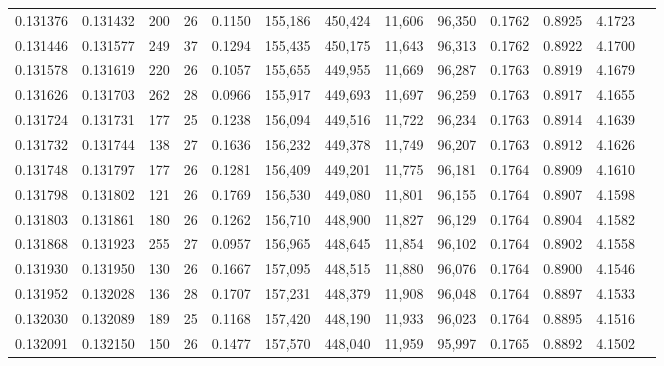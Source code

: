 \begin{tabular}{rrrrrrrrrrrrr}
0.131376 & 0.131432 &   200 &  26 &                                     0.1150 & 155,186 & 450,424 &  11,606 &  96,350 & 0.1762 & 0.8925 & 4.1723 \\
0.131446 & 0.131577 &   249 &  37 &                                     0.1294 & 155,435 & 450,175 &  11,643 &  96,313 & 0.1762 & 0.8922 & 4.1700 \\
0.131578 & 0.131619 &   220 &  26 &                                     0.1057 & 155,655 & 449,955 &  11,669 &  96,287 & 0.1763 & 0.8919 & 4.1679 \\
0.131626 & 0.131703 &   262 &  28 &                                     0.0966 & 155,917 & 449,693 &  11,697 &  96,259 & 0.1763 & 0.8917 & 4.1655 \\
0.131724 & 0.131731 &   177 &  25 &                                     0.1238 & 156,094 & 449,516 &  11,722 &  96,234 & 0.1763 & 0.8914 & 4.1639 \\
0.131732 & 0.131744 &   138 &  27 &                                     0.1636 & 156,232 & 449,378 &  11,749 &  96,207 & 0.1763 & 0.8912 & 4.1626 \\
0.131748 & 0.131797 &   177 &  26 &                                     0.1281 & 156,409 & 449,201 &  11,775 &  96,181 & 0.1764 & 0.8909 & 4.1610 \\
0.131798 & 0.131802 &   121 &  26 &                                     0.1769 & 156,530 & 449,080 &  11,801 &  96,155 & 0.1764 & 0.8907 & 4.1598 \\
0.131803 & 0.131861 &   180 &  26 &                                     0.1262 & 156,710 & 448,900 &  11,827 &  96,129 & 0.1764 & 0.8904 & 4.1582 \\
0.131868 & 0.131923 &   255 &  27 &                                     0.0957 & 156,965 & 448,645 &  11,854 &  96,102 & 0.1764 & 0.8902 & 4.1558 \\
0.131930 & 0.131950 &   130 &  26 &                                     0.1667 & 157,095 & 448,515 &  11,880 &  96,076 & 0.1764 & 0.8900 & 4.1546 \\
0.131952 & 0.132028 &   136 &  28 &                                     0.1707 & 157,231 & 448,379 &  11,908 &  96,048 & 0.1764 & 0.8897 & 4.1533 \\
0.132030 & 0.132089 &   189 &  25 &                                     0.1168 & 157,420 & 448,190 &  11,933 &  96,023 & 0.1764 & 0.8895 & 4.1516 \\
0.132091 & 0.132150 &   150 &  26 &                                     0.1477 & 157,570 & 448,040 &  11,959 &  95,997 & 0.1765 & 0.8892 & 4.1502 \\

\end{tabular}
